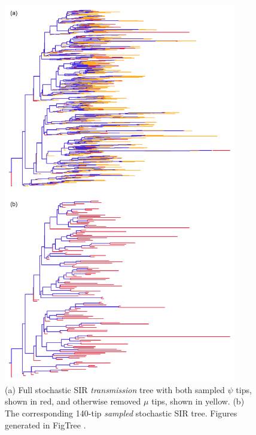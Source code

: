 \documentclass[12pt,titlepage]{article}
\begin{document}
\begin{figure}
  \begin{center}
    \includegraphics[width=4in]{Fig2.pdf}
  \end{center}
    \caption{(a) Full stochastic SIR \textit{transmission} tree with both sampled $\psi$ tips, shown in red, and otherwise removed $\mu$ tips, shown in yellow. 
      (b) The corresponding 140-tip \textit{sampled} stochastic SIR tree. 
      Figures generated in FigTree \citep{FigTree}.}
  \label{fig:Tree}
\end{figure}
% 
\end{document}
